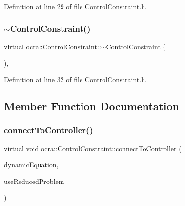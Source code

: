 Definition at line 29 of file Control\+Constraint.\+h.

\hypertarget{classocra_1_1ControlConstraint_a49f1eb50f143ef0e438d3af43db9eb31}{}\label{classocra_1_1ControlConstraint_a49f1eb50f143ef0e438d3af43db9eb31} 
\subsubsection{\texorpdfstring{$\sim$\+Control\+Constraint()}{~ControlConstraint()}}
{\footnotesize\ttfamily virtual ocra\+::\+Control\+Constraint\+::$\sim$\+Control\+Constraint (\begin{DoxyParamCaption}{ }\end{DoxyParamCaption})\hspace{0.3cm}{\ttfamily [inline]}, {\ttfamily [virtual]}}



Definition at line 32 of file Control\+Constraint.\+h.



\subsection{Member Function Documentation}
\hypertarget{classocra_1_1ControlConstraint_a04dabdc1c469146e7b3240dfe0a5172c}{}\label{classocra_1_1ControlConstraint_a04dabdc1c469146e7b3240dfe0a5172c} 
\subsubsection{\texorpdfstring{connect\+To\+Controller()}{connectToController()}}
{\footnotesize\ttfamily virtual void ocra\+::\+Control\+Constraint\+::connect\+To\+Controller (\begin{DoxyParamCaption}\item[{const \hyperlink{classocra_1_1FullDynamicEquationFunction}{Full\+Dynamic\+Equation\+Function} \&}]{dynamic\+Equation,  }\item[{bool}]{use\+Reduced\+Problem }\end{DoxyParamCaption})\hspace{0.3cm}{\ttfamily [pure virtual]}}



